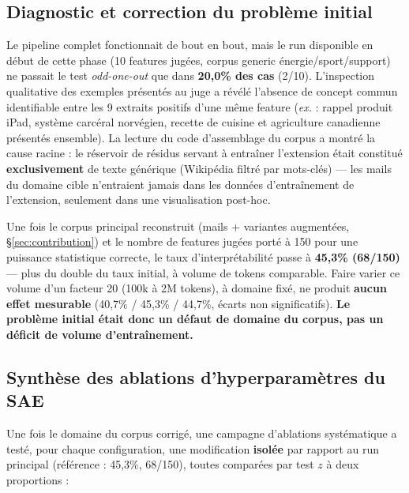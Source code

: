 \documentclass[11pt]{article}
\begin{document}
\subsection{Diagnostic et correction du problème initial}
\label{subsec:diagnostic-initial}

Le pipeline complet fonctionnait de bout en bout, mais le run disponible en
début de cette phase (10 features jugées, corpus generic
énergie/sport/support) ne passait le test \emph{odd-one-out} que dans
\textbf{20,0\% des cas} (2/10). L'inspection qualitative des exemples présentés
au juge a révélé l'absence de concept commun identifiable entre les 9 extraits
positifs d'une même feature (\emph{ex.} : rappel produit iPad, système
carcéral norvégien, recette de cuisine et agriculture canadienne présentés
ensemble). La lecture du code d'assemblage du corpus a montré la cause
racine : le réservoir de résidus servant à entraîner l'extension était
constitué \textbf{exclusivement} de texte générique (Wikipédia filtré par
mots-clés) --- les mails du domaine cible n'entraient jamais dans les données
d'entraînement de l'extension, seulement dans une visualisation post-hoc.

\begin{resultbox}
Une fois le corpus principal reconstruit (mails + variantes augmentées,
\S\ref{sec:contribution}) et le nombre de features jugées porté à 150 pour une
puissance statistique correcte, le taux d'interprétabilité passe à
\textbf{45,3\% (68/150)} --- plus du double du taux initial, à volume de
tokens comparable. Faire varier ce volume d'un facteur 20 (100k à 2M tokens),
à domaine fixé, ne produit \textbf{aucun effet mesurable} (40,7\% / 45,3\% /
44,7\%, écarts non significatifs). \textbf{Le problème initial était donc un
défaut de domaine du corpus, pas un déficit de volume d'entraînement.}
\end{resultbox}

\subsection{Synthèse des ablations d'hyperparamètres du SAE}
\label{subsec:synthese-ablations}

Une fois le domaine du corpus corrigé, une campagne d'ablations systématique
a testé, pour chaque configuration, une modification \textbf{isolée} par
rapport au run principal (référence : 45,3\%, 68/150), toutes comparées par
test $z$ à deux proportions :
\end{document}

